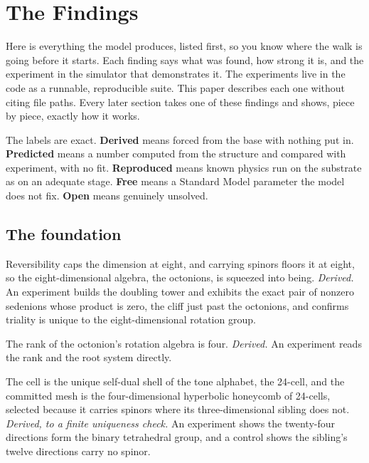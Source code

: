\section{The Findings}

Here is everything the model produces, listed first, so you know where the walk is going before it starts. Each finding says what was found, how strong it is, and the experiment in the simulator that demonstrates it. The experiments live in the code as a runnable, reproducible suite. This paper describes each one without citing file paths. Every later section takes one of these findings and shows, piece by piece, exactly how it works.

The labels are exact. \textbf{Derived} means forced from the base with nothing put in. \textbf{Predicted} means a number computed from the structure and compared with experiment, with no fit. \textbf{Reproduced} means known physics run on the substrate as on an adequate stage. \textbf{Free} means a Standard Model parameter the model does not fix. \textbf{Open} means genuinely unsolved.

\subsection*{The foundation}

\begin{finding}
Reversibility caps the dimension at eight, and carrying spinors floors it at eight, so the eight-dimensional algebra, the octonions, is squeezed into being. \emph{Derived.} An experiment builds the doubling tower and exhibits the exact pair of nonzero sedenions whose product is zero, the cliff just past the octonions, and confirms triality is unique to the eight-dimensional rotation group.
\end{finding}

\begin{finding}
The rank of the octonion's rotation algebra is four. \emph{Derived.} An experiment reads the rank and the root system directly.
\end{finding}

\begin{finding}
The cell is the unique self-dual shell of the tone alphabet, the 24-cell, and the committed mesh is the four-dimensional hyperbolic honeycomb of 24-cells, selected because it carries spinors where its three-dimensional sibling does not. \emph{Derived, to a finite uniqueness check.} An experiment shows the twenty-four directions form the binary tetrahedral group, and a control shows the sibling's twelve directions carry no spinor.
\end{finding}

